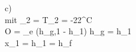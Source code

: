 c) \\
mit \quad {}_2 =  \quad {} \quad T_2 = -22^\circ C \\
O = _e (h_{g,1} - h_1) \quad \Rightarrow \quad h_{g} = h_1 \\

x_1 =  \quad {} \quad h_1 = h_f \\